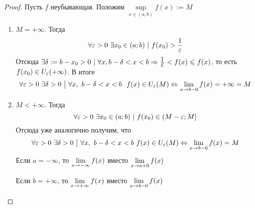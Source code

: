 \begin{proof}
	Пусть $f$ неубывающая. Положим $\sup\limits_{x \in (a; b)} f(x) := M$
	\begin{enumerate}
		\item $M = +\infty$. Тогда
		\[
			\forall \varepsilon > 0\ \exists x_0 \in (a; b)\ |\ f(x_0) > \frac{\displaystyle 1}{\displaystyle \varepsilon}
		\]
		Отсюда $\exists \delta := b - x_0 > 0\ |\ \forall x, b - \delta < x < b \Rightarrow \frac{\displaystyle 1}{\displaystyle \varepsilon} < f(x) \leqslant f(x)$, то есть $f(x_0) \in U_{\varepsilon}(+\infty)$. В итоге
		\[
			\forall \varepsilon > 0\ \exists \delta > 0 \ \big|\  \forall x,\ b - \delta < x < b\ \ f(x) \in U_{\varepsilon}(M) \Leftrightarrow \lim\limits_{x \to b-0} f(x) = +\infty = M
		\]
		
		\item $M < +\infty$. Тогда
		\[
			\forall \varepsilon > 0\ \exists x_0 \in (a; b)\ |\ f(x_0) \in (M - \varepsilon; M]
		\]
		Отсюда уже аналогично получим, что
		\[
			\forall \varepsilon > 0\ \exists \delta > 0 \ \big|\  \forall x,\ b - \delta < x < b\ f(x) \in U_{\varepsilon}(M) \Leftrightarrow \lim\limits_{x \to b-0} f(x) = M
		\]
		Если $a = -\infty$, то $\lim\limits_{x \to -\infty} f(x)$ вместо $\lim\limits_{x \to a+0} f(x)$
		
		Если $b = +\infty$, то $\lim\limits_{x \to +\infty} f(x)$ вместо $\lim\limits_{x \to b-0} f(x)$
		
		
	\end{enumerate}
\end{proof}
